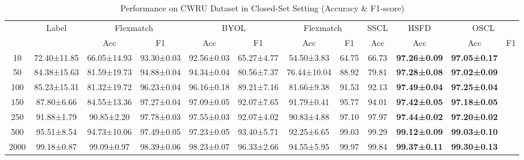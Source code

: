 \documentclass[journal]{IEEEtran}
\begin{document}
\begin{table}[!t]
\centering
\caption{Performance on CWRU Dataset in Closed-Set Setting (Accuracy \& F1-score)}
\label{tab:cwru_closed_set}
\small
\setlength{\tabcolsep}{2.2pt}
\begin{tabular}{@{\hspace{2pt}}c|c|cc|cc|cc|c|c|cc@{\hspace{2pt}}}
  \toprule
  & Label & \multicolumn{2}{c}{Flexmatch} & \multicolumn{2}{c}{BYOL} & 
  \multicolumn{2}{c}{Flexmatch} & \multicolumn{1}{c}{SSCL} & 
  \multicolumn{1}{c}{HSFD} & \multicolumn{2}{c}{OSCL} \\
  \cmidrule{3-12}
  & & Acc & F1 & Acc & F1 & Acc & F1 & Acc & Acc & Acc & F1 \\
  \midrule
  10   & 72.40±11.85  & 66.05±14.93  & 93.30±0.03  & 92.56±0.03  & 65.27±4.77  & 54.50±3.83  & 64.75  & 66.73  & \textbf{97.26±0.09}  & \textbf{97.05±0.17} \\
  50   & 84.38±15.63  & 81.59±19.73  & 94.88±0.04  & 94.34±0.04  & 80.56±7.37  & 76.44±10.04 & 88.92  & 79.81  & \textbf{97.28±0.08}  & \textbf{97.02±0.09} \\
  100  & 85.23±15.31  & 81.32±19.72  & 96.23±0.04  & 96.16±0.18  & 89.21±7.16  & 81.66±9.38  & 91.53  & 92.13  & \textbf{97.49±0.04}  & \textbf{97.25±0.04} \\
  150  & 87.80±6.66   & 84.55±13.36  & 97.27±0.04  & 97.09±0.05  & 92.07±7.65  & 91.79±0.41  & 95.77  & 94.01  & \textbf{97.42±0.05}  & \textbf{97.18±0.05} \\
  250  & 91.88±1.79   & 90.85±2.20   & 97.78±0.03  & 97.55±0.03  & 92.07±4.02  & 90.83±4.88  & 97.10  & 97.97  & \textbf{97.44±0.02}  & \textbf{97.20±0.02} \\
  500  & 95.51±8.54   & 94.73±10.06  & 97.49±0.05  & 97.23±0.05  & 93.40±5.71  & 92.25±6.65  & 99.03  & 99.29  & \textbf{99.12±0.09}  & \textbf{99.03±0.10} \\
  2000 & 99.18±0.87   & 99.09±0.97   & 98.39±0.06  & 98.23±0.07  & 96.33±2.66  & 94.55±5.95  & 99.97  & 99.84  & \textbf{99.37±0.11}  & \textbf{99.30±0.13} \\
  \bottomrule
\end{tabular}
\end{table}
\end{document}
